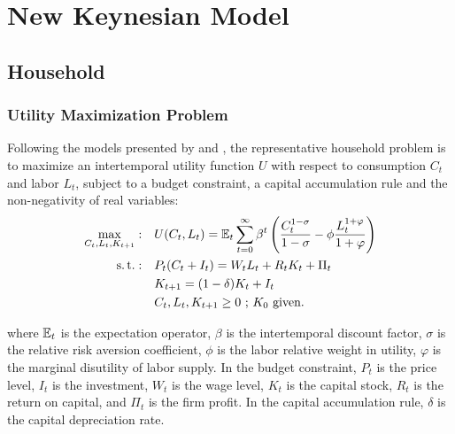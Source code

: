 \documentclass[../thesis.tex]{subfiles}
\begin{document}
	
	\newpage
	
\section{New Keynesian Model}\label{sec_v0:nk-model}
	
	{
		\setlength{\parskip}{1pt}
		\singlespacing
		\localtableofcontents
	}

\newpage


	\subsection{Household}
	
	\subsubsection*{Utility Maximization Problem}
	
	
	Following the models presented by \textcite{costa_junior_understanding_2016} and \textcite{solis-garcia_ucb_2022}, the representative household problem is to maximize an intertemporal utility function $U$ with respect to consumption $C_t$ and labor $L_t$, subject to a budget constraint, a capital accumulation rule and the non-negativity of real variables:
	\begin{align}
		\label{eq_v0:household-utility-function}
		\max_{C_t,L_t,K_{t+1}}: \quad & U(C_t,L_t) = {\mathbb{E}_{t}} \sum_{t=0}^{\infty} \beta^t \left(\frac{C_t^{1-\sigma}}{1-\sigma} - \phi \frac{L_t^{1+\varphi}}{1+\varphi} \right) \\
		\label{eq_v0:household-budget-constraint}
		\operatorname{s.t.}: \quad & P_t (C_t + I_t) = W_t L_t + R_t K_t + \Pi_t \\
		\label{eq_v0:law-of-motion-for-capital}
		\quad & K_{t+1} = (1-\delta)K_t + I_t \\
		\quad & C_t,L_t,K_{t+1} \geq 0 \text{ ; $K_0$ given.} \nonumber
	\end{align}
	
	where ${\mathbb{E}_{t}}$ is the expectation operator, $\beta$ is the intertemporal discount factor, $\sigma$ is the relative risk aversion coefficient, $\phi$ is the labor relative weight in utility, $\varphi$ is the marginal disutility of labor supply. In the budget constraint, $P_t$ is the price level, $I_t$ is the investment, $W_t$ is the wage level, $K_t$ is the capital stock, $R_t$ is the return on capital, and $\Pi_t$ is the firm profit. In the capital accumulation rule, $\delta$ is the capital depreciation rate.
	
\end{document}
